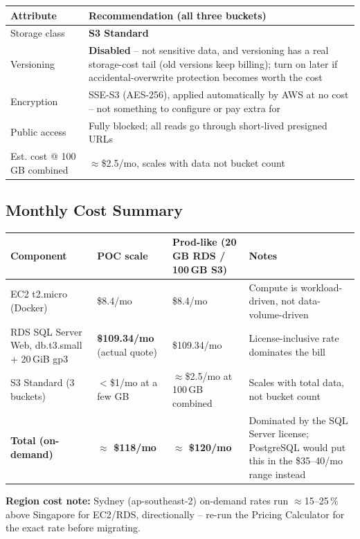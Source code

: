 \documentclass[10pt]{article}
\begin{document}
\noindent \begin{tabularx}{\textwidth}{@{}l X@{}}
\toprule
\rowcolor{tableHead} \textbf{Attribute} & \textbf{Recommendation (all three buckets)} \\
\midrule
Storage class & \textbf{S3 Standard} \\
\rowcolor{tableAlt} Versioning & \textbf{Disabled} -- not sensitive data, and versioning has a real storage-cost tail (old versions keep billing); turn on later if accidental-overwrite protection becomes worth the cost \\
Encryption & SSE-S3 (AES-256), applied automatically by AWS at no cost -- not something to configure or pay extra for \\
\rowcolor{tableAlt} Public access & Fully blocked; all reads go through short-lived presigned URLs \\
Est. cost @ 100\,GB combined & $\approx$\$2.5/mo, scales with data not bucket count \\
\bottomrule
\end{tabularx}

\subsection{Monthly Cost Summary}

\noindent \begin{tabularx}{\textwidth}{@{}l X X X@{}}
\toprule
\rowcolor{tableHead} \textbf{Component} & \textbf{POC scale} & \textbf{Prod-like (20\,GB RDS / 100\,GB S3)} & \textbf{Notes} \\
\midrule
EC2 t2.micro (Docker) & \$8.4/mo & \$8.4/mo & Compute is workload-driven, not data-volume-driven \\
\rowcolor{tableAlt} RDS SQL Server Web, db.t3.small + 20\,GiB gp3 & \textbf{\$109.34/mo} (actual quote) & \$109.34/mo & License-inclusive rate dominates the bill \\
S3 Standard (3 buckets) & $<$\$1/mo at a few GB & $\approx$\$2.5/mo at 100\,GB combined & Scales with total data, not bucket count \\
\midrule
\rowcolor{tableAlt} \textbf{Total (on-demand)} & \textbf{$\approx$ \$118/mo} & \textbf{$\approx$ \$120/mo} & Dominated by the SQL Server license; PostgreSQL would put this in the \$35--40/mo range instead \\
\bottomrule
\end{tabularx}

\textbf{Region cost note:} Sydney (ap-southeast-2) on-demand rates run
$\approx$15--25\,\% above Singapore for EC2/RDS, directionally -- re-run the
Pricing Calculator for the exact rate before migrating.
\end{document}
